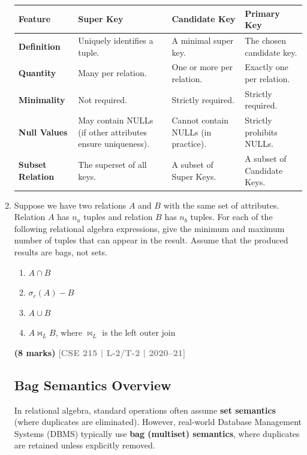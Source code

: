 \documentclass[12pt,a3paper]{article}
\newcommand{\yr}[1]{\hfill\textcolor{gray}{\small\textbf{[#1]}}}
\newcommand{\mk}[1]{\textcolor{orange!70!black}{\small\textbf{(#1 marks)}}}
\begin{document}
\begin{enumerate}
\begin{tcolorbox}[enhanced,breakable,ansbox,colback=cA!4,colframe=cA,boxrule=0.8pt,arc=5pt,title={\textbf{Answer}},fonttitle=\bfseries\color{white},colbacktitle=cA]
\begin{center}
\renewcommand{\arraystretch}{1.4}
\begin{tabularx}{\textwidth}{@{} >{\bfseries}l X X X @{}}
\toprule
Feature & Super Key & Candidate Key & Primary Key \\
\midrule
\textbf{Definition} & Uniquely identifies a tuple. & A minimal super key. & The chosen candidate key. \\
\textbf{Quantity} & Many per relation. & One or more per relation. & Exactly one per relation. \\
\textbf{Minimality} & Not required. & Strictly required. & Strictly required. \\
\textbf{Null Values} & May contain NULLs (if other attributes ensure uniqueness). & Cannot contain NULLs (in practice). & Strictly prohibits NULLs. \\
\textbf{Subset Relation} & The superset of all keys. & A subset of Super Keys. & A subset of Candidate Keys. \\
\bottomrule
\end{tabularx}
\end{center}


\end{tcolorbox}

\item Suppose we have two relations $A$ and $B$ with the same set of attributes. Relation $A$ has $n_a$ tuples and relation $B$ has $n_b$ tuples. For each of the following relational algebra expressions, give the minimum and maximum number of tuples that can appear in the result. Assume that the produced results are bags, not sets.
\begin{enumerate}
  \item $A \cap B$
  \item $\sigma_c(A) - B$
  \item $A \cup B$
  \item $A \bowtie_L B$, where $\bowtie_L$ is the left outer join
\end{enumerate}
\mk{8} \yr{CSE 215 | L-2/T-2 | 2020--21}

\begin{tcolorbox}[enhanced,breakable,ansbox,colback=cA!4,colframe=cA,boxrule=0.8pt,arc=5pt,title={\textbf{Answer}},fonttitle=\bfseries\color{white},colbacktitle=cA]

\subsection*{Bag Semantics Overview}
In relational algebra, standard operations often assume \textbf{set semantics} (where duplicates are eliminated). However, real-world Database Management Systems (DBMS) typically use \textbf{bag (multiset) semantics}, where duplicates are retained unless explicitly removed. 


\end{tcolorbox}
\end{enumerate}
\end{document}
